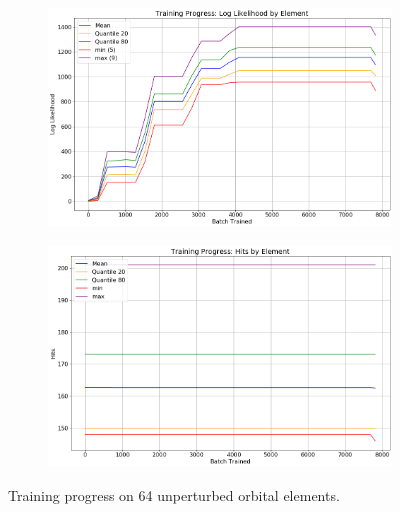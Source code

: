 \begin{figure}[h]
\begin{subfigure}[t]{\subfigwidth\textwidth}
\centering
\includegraphics[width=\linewidth]{../figs/search_known/unperturbed/learning_curve_log_like.png}
\end{subfigure}
\hfill
\begin{subfigure}[t]{\subfigwidth\textwidth}
\centering
\includegraphics[width=\linewidth]{../figs/search_known/unperturbed/learning_curve_hits.png}
\end{subfigure}
\caption{Training progress on 64 unperturbed orbital elements.}
\label{fig:TrainUnperturbed}
\end{figure}

